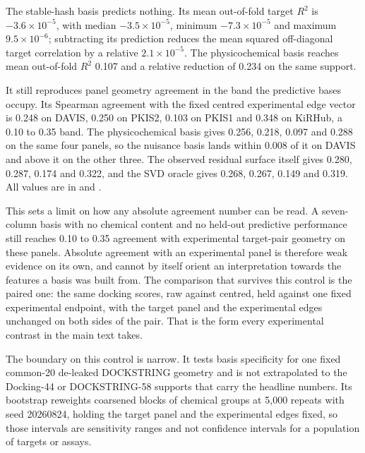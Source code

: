 The stable-hash basis predicts nothing. Its mean out-of-fold target $R^2$ is
$-3.6\times 10^{-5}$, with median $-3.5\times 10^{-5}$, minimum $-7.3\times 10^{-5}$ and
maximum $9.5\times 10^{-6}$; subtracting its prediction reduces the mean squared off-diagonal
target correlation by a relative $2.1\times 10^{-5}$. The physicochemical basis reaches mean
out-of-fold $R^2$ 0.107 and a relative reduction of 0.234 on the same support.

It still reproduces panel geometry agreement in the band the predictive bases occupy. Its
Spearman agreement with the fixed centred experimental edge vector is 0.248 on DAVIS, 0.250 on
PKIS2, 0.103 on PKIS1 and 0.348 on KiRHub, a 0.10 to 0.35 band. The physicochemical basis gives
0.256, 0.218, 0.097 and 0.288 on the same four panels, so the nuisance basis lands within 0.008
of it on DAVIS and above it on the other three. The observed residual surface itself gives
0.280, 0.287, 0.174 and 0.322, and the SVD oracle gives 0.268, 0.267, 0.149 and 0.319. All
values are in
 and
.

This sets a limit on how any absolute agreement number can be read. A seven-column basis with
no chemical content and no held-out predictive performance still reaches 0.10 to 0.35 agreement
with experimental target-pair geometry on these panels. Absolute agreement with an experimental
panel is therefore weak evidence on its own, and cannot by itself orient an interpretation
towards the features a basis was built from. The comparison that survives this control is the
paired one: the same docking scores, raw against centred, held against one fixed experimental
endpoint, with the target panel and the experimental edges unchanged on both sides of the
pair. That is the form every experimental contrast in the main text takes.

The boundary on this control is narrow. It tests basis specificity for one fixed common-20
de-leaked DOCKSTRING geometry and is not extrapolated to the Docking-44 or DOCKSTRING-58
supports that carry the headline numbers. Its bootstrap reweights coarsened blocks of chemical
groups at 5{,}000 repeats with seed 20260824, holding the target panel and the experimental
edges fixed, so those intervals are sensitivity ranges and not confidence intervals for a
population of targets or assays.
